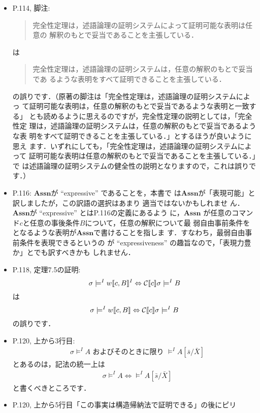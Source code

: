 \documentclass[12pt,titlepage,twoside,openright,dvipdfmx]{jsbook}
\theoremstyle{definition}
\begin{document}
\begin{itemize}
\item P.114, 脚注:
  \begin{quote}
    完全性定理は，述語論理の証明システムによって証明可能な表明は任意の
    解釈のもとで妥当であることを主張している．
  \end{quote}
  は
  \begin{quote}
    完全性定理は，述語論理の証明システムは，任意の解釈のもとで妥当であ
    るような表明をすべて証明できることを主張している．
  \end{quote}
  の誤りです．（原著の脚注は「完全性定理は，述語論理の証明システムによっ
  て証明可能な表明は，任意の解釈のもとで妥当であるような表明と一致する」
  とも読めるように思えるのですが，完全性定理の説明としては，「完全性定
  理は，述語論理の証明システムは，任意の解釈のもとで妥当であるような表
  明をすべて証明できることを主張している．」とするほうが良いように思え
  ます．いずれにしても，「完全性定理は，述語論理の証明システムによって
  証明可能な表明は任意の解釈のもとで妥当であることを主張している．」で
  は述語論理の証明システムの健全性の説明となりますので，これは誤りで
  す．）
\item P.116: $\mathbf{Assn}$が ``expressive'' であることを，本書で
  は$\mathbf{Assn}$が「表現可能」と訳しましたが，この訳語の選択はあまり
  適当ではないかもしれませ
  ん．$\mathbf{Assn}$が ``expressive'' とはP.116の定義にあるよう
  に，$\mathbf{Assn}$
  が任意のコマンド$c$と任意の事後条件$B$について，任意の解釈について最
  弱自由事前条件をとなるような表明が$\mathbf{Assn}$で書けることを指しま
  す．すなわち，最弱自由事前条件を表現できるというの
  が ``expressiveness'' の趣旨なので，「表現力豊か」とでも訳すべきかも
  しれません．
\item P.118, 定理7.5の証明:
  \[
    \sigma \models^I  w\llbracket c,B \rrbracket^I
    \Leftrightarrow
    \mathcal{C}\llbracket c \rrbracket\sigma \models^I B
  \]
  は
  \[
    \sigma \models^I  w\llbracket c,B \rrbracket
    \Leftrightarrow
    \mathcal{C}\llbracket c \rrbracket\sigma \models^I B
  \]
  の誤りです．
\item P.120, 上から3行目:
  \begin{align*}
    & \sigma \models^I A \text{ およびそのときに限り }
      \models^I A[\bar{s}/\bar{X}]
      \tag{$\ast$}
  \end{align*}
  とあるのは，記法の統一上は
  \begin{align*}
    & \sigma \models^I A \iff
      \models^I A[\bar{s}/\bar{X}]
      \tag{$\ast$}
  \end{align*}
  と書くべきところです．
\item P.120, 上から5行目「この事実は構造帰納法で証明できる」の後にピリ

\end{itemize}
\end{document}
